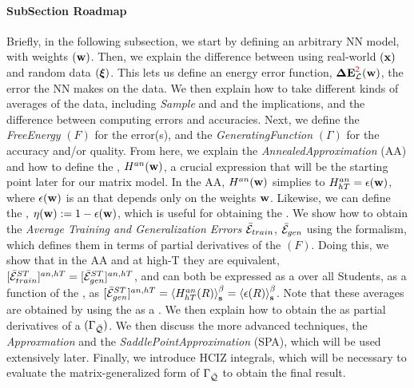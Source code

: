 \paragraph{SubSection Roadmap}
Briefly, in the following subsection,
we start by defining an arbitrary NN model, with weights $({\mathbf{w}})$.
Then, we explain the difference between using real-world $({\mathbf{x}})$ and random data $(\boldsymbol{\xi})$.
This lets us define an energy error function, $\mathbf{\Delta {E}}^{{\color{red}\sf{2}}}_{\mathcal{L}}(\mathbf{w})$,
the error the NN makes on the data.
We then explain how to take different kinds of \emph{\Thermodynamic} averages of the data,
including \emph{Sample} and \emph{\ThermalAverages} and the implications,
and the difference between computing errors and accuracies.
Next, we define the \emph{FreeEnergy} $(F)$ for the error(s), and the \emph{GeneratingFunction} $(\Gamma)$
for the accuracy and/or quality.
From here, we explain the \emph{AnnealedApproximation} (AA) and
how to define the  \emph{\AnnealedHamiltonian}, $H^{an}({\mathbf{w}})$, a crucial expression
that will be the starting point later for our matrix model.
In the AA, $H^{an}({\mathbf{w}})$ simplies to  $H^{an}_{hT}=\epsilon({\mathbf{w}})$, where $\epsilon({\mathbf{w}})$ is an \EffectivePotential
that depends only on the weights ${\mathbf{w}}$.
Likewise, we can define the \SelfOverlap, $\eta({\mathbf{w}}):=1-\epsilon({\mathbf{w}})$, which is useful for
obtaining the \Quality.
We show how to obtain the \emph{Average Training and Generalization Errors} $\bar{\mathcal{E}}_{train}$, $\bar{\mathcal{E}}_{gen}$
using the \STATMECH formalism, which defines them in terms of partial derivatives of the \FreeEnergy $(F)$.
Doing this, we show that in the AA and at high-T they are equivalent,
$[\bar{\mathcal{E}}^{ST}_{train}]^{an,hT}=[\bar{\mathcal{E}}^{ST}_{gen}]^{an,hT}$,
and can both be expressed as a \ThermalAverage over all Students, as a function 
of the \Teacher, as $[\bar{\mathcal{E}}^{ST}_{gen}]^{an,hT}=\left\langle H^{an}_{hT}(R) \right\rangle_{\mathbf s}^{\beta}=\left\langle \epsilon(R) \right\rangle_{\mathbf s}^{\beta}$.
Note that these averages are obtained by using the \FreeEnergy as a \GeneratingFunction.
We then explain how to obtain the \ModelQuality  as  partial derivatives of a
\emph{\GeneratingFunction} $(\Gamma_{\bar{\mathcal{Q}}})$.
We then discuss the more advanced techniques, the
\emph{\LargeN Approxmation} and the \emph{SaddlePointApproximation} (SPA),
which will be used extensively later.
Finally, we introduce  HCIZ integrals, which will be necessary to evaluate the matrix-generalized
form of $\Gamma_{\bar{\mathcal{Q}}}$ to obtain the final result.
